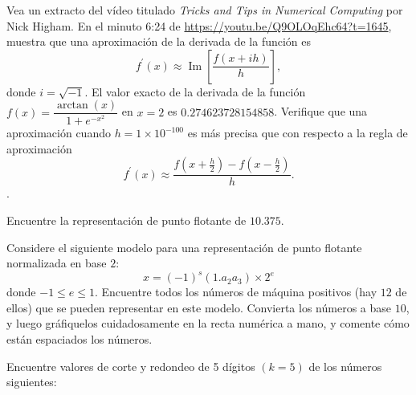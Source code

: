 \begin{questions}
    \question

    Vea un extracto del vídeo titulado \emph{Tricks and Tips in Numerical Computing} por Nick Higham.
    En el minuto 6:24 de \url{https://youtu.be/Q9OLOqEhc64?t=1645}, muestra que una aproximación de
    la derivada de la función es
    \begin{equation*}
        f^{\prime}\left(x\right)\approx
        \operatorname{Im}
        \left[
            \frac{f\left(x+ih\right)}{h}
            \right],
    \end{equation*}
    donde $i=\sqrt{-1}$.
    El valor exacto de la derivada de la función
    \begin{math}
        f\left(x\right)=
        \dfrac{\arctan\left(x\right)}{1+e^{-x^{2}}}
    \end{math}
    en $x=2$ es $0.274623728154858$.
    Verifique que una aproximación cuando $h=1\times 10^{-100}$ es
    más precisa que con respecto a la regla de aproximación
    \begin{equation*}
        f^{\prime}\left(x\right)\approx
        \frac{f\left(x+\frac{h}{2}\right)-f\left(x-\frac{h}{2}\right)}{h}.
    \end{equation*}.


    \question

    Encuentre la representación de punto flotante de $10.375$.

    \question

    Considere el siguiente modelo para una representación de punto
    flotante normalizada en base $2$:
    \begin{equation*}
        x=\left(-1\right)^{s}
        \left(1.a_{2}a_{3}\right)
        \times 2^{e}
    \end{equation*}
    donde $-1\leq e\leq 1$.
    Encuentre todos los números de máquina positivos (hay $12$ de
    ellos) que se pueden representar en este modelo.
    Convierta los números a base $10$, y luego gráfiquelos
    cuidadosamente en la recta numérica a mano, y comente cómo están
    espaciados los números.

    \question

    Encuentre valores de corte y redondeo de 5 dígitos
    $\left(k=5\right)$ de los números siguientes:

    \begin{multicols}{2}


\end{multicols}
\end{questions}
